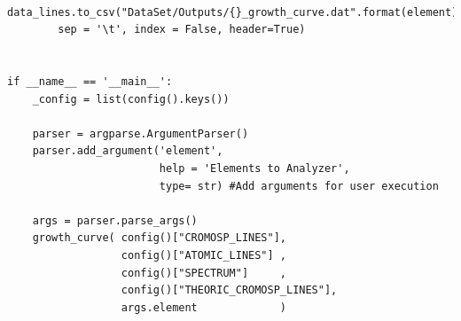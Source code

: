\documentclass[12pt,oneside,openany,letter]{book}
\begin{document}
\begin{verbatim}
    data_lines.to_csv("DataSet/Outputs/{}_growth_curve.dat".format(element), 
        sep = '\t', index = False, header=True)


if __name__ == '__main__':
    _config = list(config().keys()) 

    parser = argparse.ArgumentParser()
    parser.add_argument('element', 
                        help = 'Elements to Analyzer',
                        type= str) #Add arguments for user execution
    
    args = parser.parse_args()
    growth_curve( config()["CROMOSP_LINES"],
                  config()["ATOMIC_LINES"] ,
                  config()["SPECTRUM"]     ,
                  config()["THEORIC_CROMOSP_LINES"],
                  args.element             )

\end{verbatim}



\end{document}

